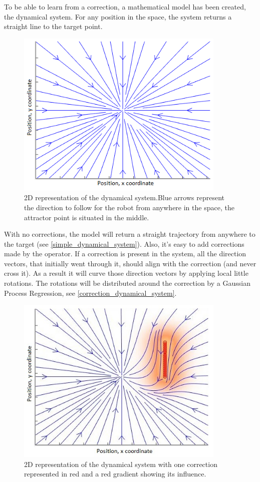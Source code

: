 To be able to learn from a correction, a mathematical model has been created, the dynamical system. For any position in the space, the system returns a straight line to the target point.

\begin{figure}[H]
\centering
\includegraphics[width=10cm]{img/dynamical_system_empty.png}
\caption{2D representation of the dynamical system.\newline Blue arrows represent the direction to follow for the robot from anywhere in the space, the attractor point is situated in the middle.}
\label{simple_dynamical_system}
\end{figure}

With no corrections, the model will return a straight trajectory from anywhere to the target (see \autoref{simple_dynamical_system}). Also, it's easy to add corrections made by the operator. If a correction is present in the system, all the direction vectors, that initially went through it, should align with the correction (and never cross it). As a result it will curve those direction vectors by applying local little rotations. The rotations will be distributed around the correction by a Gaussian Process Regression, see \autoref{correction_dynamical_system}.

\begin{figure}[H]
\centering
\includegraphics[width=10cm]{img/dynamical_system_1_correction.jpg}
\caption{2D representation of the dynamical system with one correction represented in red and a red gradient showing its influence.}
\label{correction_dynamical_system}
\end{figure}

